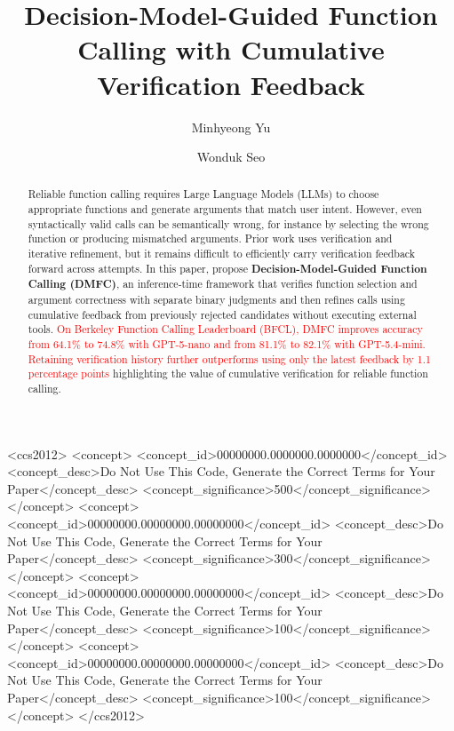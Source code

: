 \documentclass[sigconf]{acmart}
\begin{document}
\title{Decision-Model-Guided Function Calling with Cumulative Verification Feedback}

\author{Minhyeong Yu}


\author{Wonduk Seo}
\correspondingauthor
{}



\renewcommand{\shortauthors}{Trovato et al.}

\begin{abstract}


Reliable function calling requires Large Language Models (LLMs) to choose appropriate functions and generate arguments that match user intent. However, even syntactically valid calls can be semantically wrong, for instance by selecting the wrong function or producing mismatched arguments. Prior work uses verification and iterative refinement, but it remains difficult to efficiently carry verification feedback forward across attempts. In this paper, propose \textbf{Decision-Model-Guided Function Calling (DMFC)}, an inference-time framework that verifies function selection and argument correctness with separate binary judgments and then refines calls using cumulative feedback from previously rejected candidates without executing external tools. \textcolor{red}{On Berkeley Function Calling Leaderboard (BFCL), DMFC improves accuracy from 64.1\% to 74.8\% with GPT-5-nano and from 81.1\% to 82.1\% with GPT-5.4-mini. Retaining verification history further outperforms using only the latest feedback by 1.1 percentage points} highlighting the value of cumulative verification for reliable function calling.
\end{abstract}


\begin{CCSXML}
<ccs2012>
 <concept>
  <concept_id>00000000.0000000.0000000</concept_id>
  <concept_desc>Do Not Use This Code, Generate the Correct Terms for Your Paper</concept_desc>
  <concept_significance>500</concept_significance>
 </concept>
 <concept>
  <concept_id>00000000.00000000.00000000</concept_id>
  <concept_desc>Do Not Use This Code, Generate the Correct Terms for Your Paper</concept_desc>
  <concept_significance>300</concept_significance>
 </concept>
 <concept>
  <concept_id>00000000.00000000.00000000</concept_id>
  <concept_desc>Do Not Use This Code, Generate the Correct Terms for Your Paper</concept_desc>
  <concept_significance>100</concept_significance>
 </concept>
 <concept>
  <concept_id>00000000.00000000.00000000</concept_id>
  <concept_desc>Do Not Use This Code, Generate the Correct Terms for Your Paper</concept_desc>
  <concept_significance>100</concept_significance>
 </concept>
</ccs2012>
\end{CCSXML}
\end{document}
